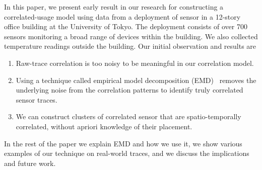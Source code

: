 In this paper, we present early result in our research for constructing a correlated-usage model using data
from a deployment of sensor in a 12-story office building at the University of Tokyo.  The deployment
consists of over 700 sensors monitoring a broad range of devices within the building.  We also collected temperature
readings outside the building.  Our initial observation and results are

\begin{enumerate}
\item Raw-trace correlation is too noisy to be meaningful in our correlation model.
\item Using a technique called empirical model decomposition (EMD)~\cite{huang:emd1998} removes the 
		underlying noise from the correlation patterns to identify truly correlated sensor traces.
\item We can construct clusters of correlated sensor that are spatio-temporally correlated, without
		apriori knowledge of their placement.
\end{enumerate}

In the rest of the paper we explain EMD and how we use it, we show various examples of our technique on real-world
traces, and we discuss the implications and future work.







